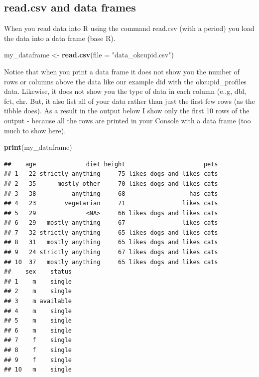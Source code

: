 \documentclass[
]{krantz}
\makeatletter
\newenvironment{Shaded}{\begin{snugshade}}{\end{snugshade}}
\newcommand{\DataTypeTok}[1]{\textcolor[rgb]{0.27,0.27,0.27}{#1}}
\newcommand{\KeywordTok}[1]{\textcolor[rgb]{0.27,0.27,0.27}{\textbf{#1}}}
\newcommand{\NormalTok}[1]{#1}
\newcommand{\StringTok}[1]{\textcolor[rgb]{0.5,0.5,0.5}{#1}}
\newenvironment{kframe}{%
\medskip{}
\setlength{\fboxsep}{.8em}
 \def\at@end@of@kframe{}%
 \ifinner\ifhmode%
  \def\at@end@of@kframe{\end{minipage}}%
  \begin{minipage}{\columnwidth}%
 \fi\fi%
 \def\FrameCommand##1{\hskip\@totalleftmargin \hskip-\fboxsep
 \colorbox{shadecolor}{##1}\hskip-\fboxsep
     \hskip-\linewidth \hskip-\@totalleftmargin \hskip\columnwidth}%
 \MakeFramed {\advance\hsize-\width
   \@totalleftmargin\z@ \linewidth\hsize
   \@setminipage}}%
 {\par\unskip\endMakeFramed%
 \at@end@of@kframe}
\renewenvironment{Shaded}{\begin{kframe}}{\end{kframe}}
\makeatother
\begin{document}
\hypertarget{read.csv-and-data-frames}{%
\subsection{read.csv and data frames}\label{read.csv-and-data-frames}}

When you read data into R using the command read.csv (with a period) you load the data into a data frame (base R).

\begin{Shaded}
\begin{Highlighting}[]
\NormalTok{my_dataframe <-}\StringTok{ }\KeywordTok{read.csv}\NormalTok{(}\DataTypeTok{file =} \StringTok{"data_okcupid.csv"}\NormalTok{)}
\end{Highlighting}
\end{Shaded}

Notice that when you print a data frame it does not show you the number of rows or columns above the data like our example did with the okcupid\_profiles data. Likewise, it does not show you the type of data in each column (e..g, dbl, fct, chr. But, it also list all of your data rather than just the first few rows (as the tibble does). As a result in the output below I show only the first 10 rows of the output - because all the rows are printed in your Console with a data frame (too much to show here).

\begin{Shaded}
\begin{Highlighting}[]
\KeywordTok{print}\NormalTok{(my_dataframe)}
\end{Highlighting}
\end{Shaded}

\begin{verbatim}
##    age              diet height                      pets
## 1   22 strictly anything     75 likes dogs and likes cats
## 2   35      mostly other     70 likes dogs and likes cats
## 3   38          anything     68                  has cats
## 4   23        vegetarian     71                likes cats
## 5   29              <NA>     66 likes dogs and likes cats
## 6   29   mostly anything     67                likes cats
## 7   32 strictly anything     65 likes dogs and likes cats
## 8   31   mostly anything     65 likes dogs and likes cats
## 9   24 strictly anything     67 likes dogs and likes cats
## 10  37   mostly anything     65 likes dogs and likes cats
##    sex    status
## 1    m    single
## 2    m    single
## 3    m available
## 4    m    single
## 5    m    single
## 6    m    single
## 7    f    single
## 8    f    single
## 9    f    single
## 10   m    single
\end{verbatim}
\end{document}
